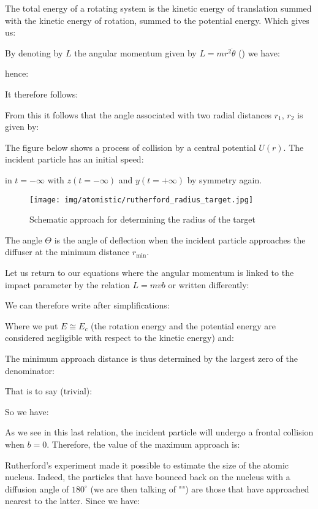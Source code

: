 	The total energy of a rotating system is the kinetic energy of translation summed with the kinetic energy of rotation, summed to the potential energy. Which gives us:
	
	By denoting by $L$ the angular momentum given by $L=mr^2\dot{\theta}$ () we have:
	
	hence:
	
	It therefore follows:
	
	From this it follows that the angle associated with two radial distances $r_1$, $r_2$ is given by:
	
	The figure below shows a process of collision by a central potential $U(r)$. The incident particle has an initial speed:
	
	in $t=-\infty$ with $z(t=-\infty)$ and $y(t=+\infty)$ by symmetry again.
	\begin{figure}[H]
		\centering
		\texttt{[image: img/atomistic/rutherford\_radius\_target.jpg]}
		\caption[]{Schematic approach for determining the radius of the target}
	\end{figure}
	The angle $\Theta$ is the angle of deflection when the incident particle approaches the diffuser at the minimum distance $r_{\min}.$

	Let us return to our equations where the angular momentum is linked to the impact parameter by the relation $L=mvb$ or written differently:
	
	We can therefore write after simplifications:
	
	Where we put $E\cong E_c$ (the rotation energy and the potential energy are considered negligible with respect to the kinetic energy) and:
	
	The minimum approach distance is thus determined by the largest zero of the denominator:
	
	That is to say (trivial):
	
	So we have:
	
	As we see in this last relation, the incident particle will undergo a frontal collision when $b=0$. Therefore, the value of the maximum approach is:
	
	Rutherford's experiment made it possible to estimate the size of the atomic nucleus. Indeed, the particles that have bounced back on the nucleus with a diffusion angle of $180^\circ$ (we are then talking of "") are those that have approached nearest to the latter. Since we have:
	
